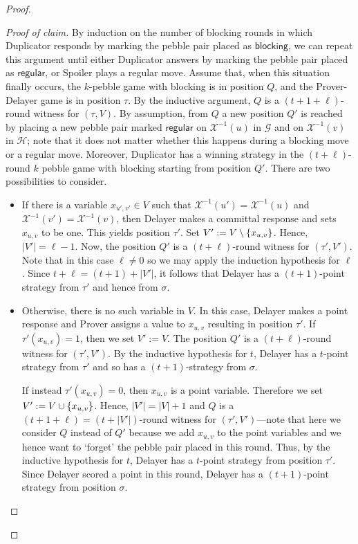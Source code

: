\documentclass[10pt,a4paper]{article}
\DeclarePairedDelimiter\set{\lbrace}{\rbrace}
\newcommand{\regular}{\mathsf{regular}}
\newcommand{\blocking}{\mathsf{blocking}}
\newcommand{\graphG}{\mathcal{G}}
\newcommand{\graphH}{\mathcal{H}}
\newcommand{\X}{\mathcal{X}}
\newcommand{\XI}{\X^{-1}}
\newenvironment{claimproof}{\begin{proof}[Proof of claim]}{\end{proof}}
\begin{document}
\begin{proof}
\begin{claimproof}
By induction on the number of blocking rounds in which Duplicator responds by marking the pebble pair placed as $\blocking$,
we can repeat this argument until either Duplicator answers by marking the pebble pair placed as $\regular$, or Spoiler plays a regular move. 
Assume that, when this situation finally occurs, the $k$-pebble game with blocking is in position $Q$,
and the Prover-Delayer game is in position $\tau$. 
By the inductive argument, $Q$ is a $(t+1+\ell)$-round witness for $(\tau,V)$. By assumption, from $Q$ a new position $Q'$ is reached by placing a new pebble pair marked $\regular$ on $\XI(u)$ in $\graphG$ and on $\XI(v)$ in $\graphH$; note that it does not matter whether this happens during a blocking move or a regular move. Moreover, Duplicator has a winning strategy in the $(t+ \ell)$-round $k$ pebble game with blocking starting from position $Q'$. There are two possibilities to consider.
%
\begin{itemize}
        \item 
If there is a variable $x_{u', v'} \in V$ such that $\XI(u') = \XI(u)$ and $\XI(v') = \XI(v)$, then Delayer makes a committal response and sets $x_{u,v}$ to be one.
This yields position $\tau'$. Set $V' := V \setminus \set{x_{u, v}}$.
Hence, $|V'| = \ell -1$. Now, the position $Q'$ is a $(t+\ell)$-round witness for $(\tau',V')$. Note that in this case $\ell \neq 0$ so we may apply the induction hypothesis for $\ell$. Since $t+\ell = (t+1) + |V'|$, it follows that
Delayer has a $(t+1)$-point strategy from
$\tau'$ and hence from $\sigma$.

\item Otherwise, there is no such variable in $V$. In this  case, Delayer makes a point response and Prover assigns a value to $x_{u,v}$ resulting in position $\tau'$.
If $\tau'(x_{u,v})=1$, then we set $V' := V$.
The position $Q'$ is a $(t+\ell)$-round witness for $(\tau',V')$.
By the inductive hypothesis for $t$, Delayer has a $t$-point strategy from $\tau'$ and so has a $(t+1)$-strategy from $\sigma$.

If instead $\tau'(x_{u,v})=0$, then $x_{u,v}$ is a point variable.
Therefore we set $V' := V \cup \set{x_{u,v}}$. Hence, $|V'| = |V| + 1$ and $Q$ is a $(t+1+\ell)=(t+|V'|)$-round witness for $(\tau',V')$---note that here we consider $Q$ instead of $Q'$ because we add $x_{u,v}$ to the point variables and we hence want to `forget' the pebble pair placed in this round. 
Thus, by the inductive hypothesis for $t$, Delayer has a $t$-point strategy from position $\tau'$. Since Delayer scored a point in this round,
Delayer has a $(t+1)$-point strategy from position $\sigma$.
\end{itemize}


\end{claimproof}
\end{proof}
\end{document}
